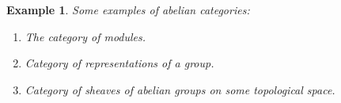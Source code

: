 \documentclass[12pt]{report}
\numberwithin{equation}{section}
\newtheorem{definition}[dummy]{Definition}
\newtheorem{example}[dummy]{Example}
\begin{document}
	\begin{example}Some examples of abelian categories:
		\begin{enumerate}
			\item The category of modules.
			\item Category of representations of a group.
			\item Category of sheaves of abelian groups on some topological space.
			

\end{enumerate}
\end{example}
\end{document}
